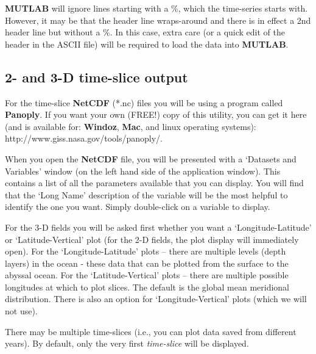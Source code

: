 \textbf{MUTLAB} will ignore lines starting with a \textsf{\footnotesize \%}, which the time-series starts with. However, it may be that the header line wraps-around and there is in effect a 2nd header line but without a \textsf{\footnotesize \%}. In this case, extra care (or a quick edit of the header in the ASCII file) will be required to load the data into \textbf{MUTLAB}.

\newpage

\subsection{2- and 3-D time-slice output}

For the time-slice \textbf{NetCDF} (*.nc) files you will be using a program called \textbf{Panoply}. If you want your own (FREE!) copy of this utility, you can get it here (and is available for: \textbf{Windoz}, \textbf{Mac}, and linux operating systems): http://www.giss.nasa.gov/tools/panoply/.

\vspace{1mm}

\noindent When you open the \textbf{NetCDF} file, you will be presented with a ‘\textsf{\footnotesize Datasets and Variables}’ window (on the left hand side of the application window). This contains a list of all the parameters available that you can display. You will find that the ‘\textsf{\footnotesize Long Name}’ description of the variable will be the most helpful to identify the one you want. Simply double-click on a variable to display. 

For the 3-D fields you will be asked first whether you want a ‘\textsf{\footnotesize \footnotesize Longitude-Latitude}’ or ‘\textsf{\footnotesize Latitude-Vertical}’ plot (for the 2-D fields, the plot display will immediately open).
For the ‘\textsf{\footnotesize Longitude-Latitude}’ plots – there are multiple levels (depth layers) in the ocean - these data that can be plotted from the surface to the abyssal ocean. For the ‘\textsf{\footnotesize Latitude-Vertical}' plots – there are multiple possible longitudes at which to plot slices. The default is the global mean meridional distribution. There is also an option for ‘\textsf{\footnotesize Longitude-Vertical}' plots (which we will not use).

There may be multiple time-slices (i.e., you can plot data saved from different years). By default, only the very first \textit{time-slice} will be displayed.

